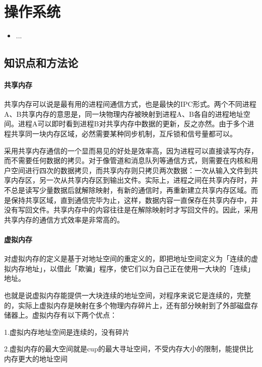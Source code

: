 \chapter{操作系统}
\label{chap1}
\begin{itemize}[noitemsep,topsep=0pt,parsep=0pt,partopsep=0pt]
	\item ...
\end{itemize}

\section{知识点和方法论}

\subsubsection{共享内存}
共享内存可以说是最有用的进程间通信方式，也是最快的IPC形式。两个不同进程A、B共享内存的意思是，同一块物理内存被映射到进程A、B各自的进程地址空间。进程A可以即时看到进程B对共享内存中数据的更新，反之亦然。由于多个进程共享同一块内存区域，必然需要某种同步机制，互斥锁和信号量都可以。

采用共享内存通信的一个显而易见的好处是效率高，因为进程可以直接读写内存，而不需要任何数据的拷贝。对于像管道和消息队列等通信方式，则需要在内核和用户空间进行四次的数据拷贝，而共享内存则只拷贝两次数据：一次从输入文件到共享内存区，另一次从共享内存区到输出文件。实际上，进程之间在共享内存时，并不总是读写少量数据后就解除映射，有新的通信时，再重新建立共享内存区域。而是保持共享区域，直到通信完毕为止，这样，数据内容一直保存在共享内存中，并没有写回文件。共享内存中的内容往往是在解除映射时才写回文件的。因此，采用共享内存的通信方式效率是非常高的。

\subsubsection{虚拟内存}
对虚拟内存的定义是基于对地址空间的重定义的，即把地址空间定义为「连续的虚拟内存地址」，以借此「欺骗」程序，使它们以为自己正在使用一大块的「连续」地址。

也就是说虚拟内存能提供一大块连续的地址空间，对程序来说它是连续的，完整的，实际上虚拟内存是映射在多个物理内存碎片上，还有部分映射到了外部磁盘存储器上。虚拟内存有以下两个优点：

1.虚拟内存地址空间是连续的，没有碎片

2.虚拟内存的最大空间就是cup的最大寻址空间，不受内存大小的限制，能提供比内存更大的地址空间

